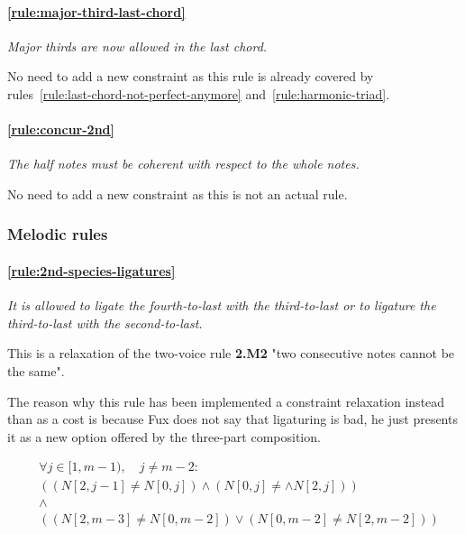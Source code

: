 \paragraph{\hspace{.5cm}\ref{rule:major-third-last-chord}} \textit{Major thirds are now allowed in the last chord.}

No need to add a new constraint as this rule is already covered by rules~\ref{rule:last-chord-not-perfect-anymore} and~\ref{rule:harmonic-triad}.

\paragraph{\hspace{.5cm}\ref{rule:concur-2nd}} \textit{The half notes must be coherent with respect to the whole notes.}

No need to add a new constraint as this is not an actual rule.

\subsubsection{Melodic rules}

    \paragraph{\hspace{.6cm}\ref{rule:2nd-species-ligatures}} \greendots \textit{It is allowed to ligate the fourth-to-last with the third-to-last or to ligature the third-to-last with the second-to-last.}  

    This is a relaxation of the two-voice rule \textbf{2.M2} "two consecutive notes cannot be the same".
    
    The reason why this rule has been implemented a constraint relaxation instead than as a cost is because Fux does not say that ligaturing is bad, he just presents it as a new option offered by the three-part composition.

    \begin{equation}
        \begin{aligned}
            &\forall j \in [1, m-1), \quad j \neq m-2:\\
            &((N[2, j-1] \neq N[0, j]) \land (N[0, j] \neq \land N[2, j])) \\
            &\land \\
            & ((N[2, m-3] \neq N[0, m-2]) \lor (N[0, m-2] \neq N[2, m-2]) )
        \end{aligned}
    \end{equation}

